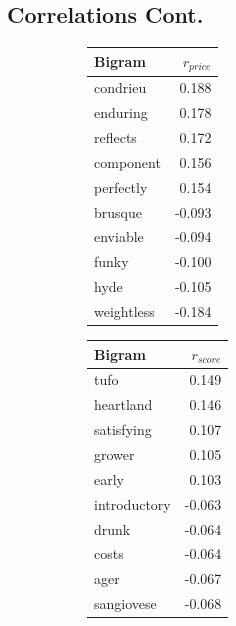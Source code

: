 \documentclass[12pt]{IEEEtran}
\begin{document}
\subsection{Correlations Cont.}
\begin{figure}[b]
    \centering
    \begin{subfigure}{0.4\columnwidth}
    \small
    \begin{tabular}{ |l|r| }
        \hline
        Bigram & $r_{price}$ \\
        \hline
        \hline
        condrieu & 0.188 \\
	    enduring & 0.178 \\ 
	    reflects & 0.172 \\
	    component & 0.156 \\
	    perfectly & 0.154 \\
        \hline
        brusque & -0.093 \\
        enviable & -0.094 \\
        funky & -0.100 \\
        hyde & -0.105 \\
        weightless & -0.184 \\
        \hline
    \end{tabular}
    \end{subfigure}
    \begin{subfigure}{0.4\columnwidth}
    \small
    \begin{tabular}{ |l|r| }
        \hline
        Bigram & $r_{score}$ \\
        \hline
        \hline
        tufo & 0.149 \\
        heartland & 0.146 \\
        satisfying & 0.107 \\
        grower & 0.105 \\
        early & 0.103 \\
        \hline
        introductory & -0.063 \\
        drunk & -0.064 \\
        costs & -0.064 \\
        ager & -0.067 \\
        sangiovese & -0.068 \\
        \hline
    \end{tabular}
    \end{subfigure}
    \begin{subfigure}{0.4\columnwidth}
    \small
    \begin{tabular}{ |l|r| }

\end{tabular}
\end{subfigure}
\end{figure}
\end{document}
